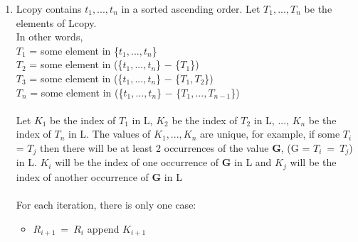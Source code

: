\documentclass[11pt,twoside]{article}
\begin{document}
\begin{enumerate}[leftmargin=0pt,label=(\alph*)]
\item Lcopy contains $t_{1},...,t_{n}$ in a sorted ascending order. Let $T_{1},...,T_{n}$ be the elements of Lcopy.\\
In other words,\\
$T_{1}$ = some element in \{$t_{1},...,t_{n}$\}\\
$T_{2}$ = some element in (\{$t_{1},...,t_{n}$\} $-$ \{$T_{1}$\})\\
$T_{3}$ = some element in (\{$t_{1},...,t_{n}$\} $-$ \{$T_{1}, T_{2}$\})\\
$T_{n}$ = some element in (\{$t_{1},...,t_{n}$\} $-$ \{$T_{1},...,T_{n-1}$\})\\\\
Let $K_{1}$ be the index of $T_{1}$ in L, $K_{2}$ be the index of $T_{2}$ in L, ..., $K_{n}$ be the index of $T_{n}$ in L. The values of $K_{1},...,K_{n}$ are unique, for example, if some $T_{i}$ = $T_{j}$ then there will be at least 2 occurrences of the value {\bf G}, (G = $T_{i}\ =\ T_{j}$) in L. $K_{i}$ will be the index of one occurrence of {\bf G} in L and $K_{j}$ will be the index of another occurrence of {\bf G} in L\\\\
For each iteration, there is only one case:
    \begin{itemize}
    \item $R_{i+1}\ =\ R_{i}$ append $K_{i+1}$
    \end{itemize}
\end{enumerate}
\end{document}
